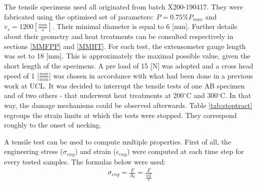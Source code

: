 The tensile specimens used all originated from batch X200-190417. They were fabricated using the optimised set of parameters: $P=0.75\% P_{max}$ and $v_s=1200 [\frac{mm}{s}]$. Their minimal diameter is equal to 6 [mm]. Further details about their geometry and heat treatments can be consulted respectively in sections \ref{MMFPP} and \ref{MMHT}. For each test, the extensometer gauge length was set to 18 [mm]. This is approximately the maximal possible value, given the short length of the specimens. A pre load of 15 [N] was adopted and a cross head speed of 1 [$\frac{mm}{min}$] was chosen in accordance with what had been done in a previous work at UCL. It was decided to interrupt the tensile tests of one AB specimen and of two others - that underwent heat treatments at 200$^\circ$C and 300$^\circ$C. In that way, the damage mechanisms could be observed afterwards. Table \ref{tab:stoptract} regroups the strain limits at which the tests were stopped. They correspond roughly to the onset of necking.\\

 \begin{center}
\begin{table}[ht]
\noindent{}

\caption[Strain limits for interrupted tensile tests of batch X200-180417 specimens]{Strain limits for interrupted tensile tests of batch X200-180417 specimens}
\label{tab:stoptract}
\end{table}
 \end{center}

A tensile test can be used to compute multiple properties. First of all,  the engineering stress ($\sigma_{eng}$) and strain  ($\epsilon_{eng}$) were computed at each time step for every tested samples. The formulas below were used:\\

\begin{align*}
\sigma_{eng}=\frac{F}{A_0}=\frac{F}{\frac{\pi d_0^2}{4}}
\end{align*}

